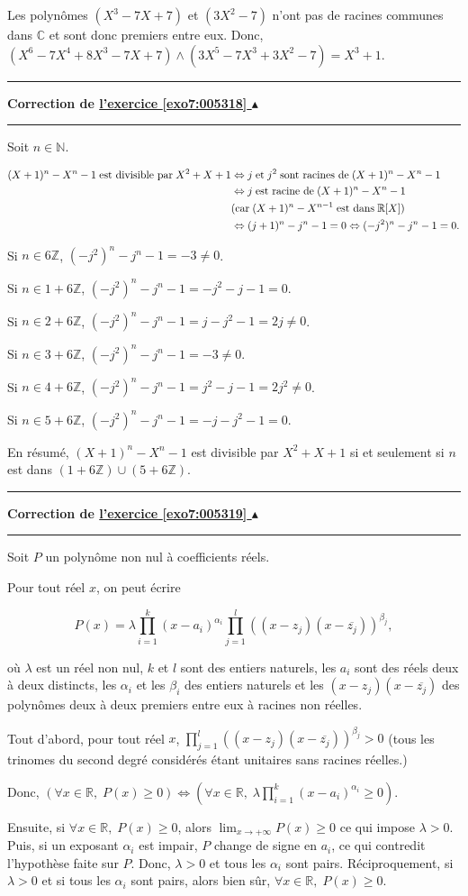 \documentclass[11pt,a4paper]{article}
\newcommand{\Nn}{\mathbb{N}} \newcommand{\N}{\mathbb{N}}
\newcommand{\Zz}{\mathbb{Z}} \newcommand{\Z}{\mathbb{Z}}
\newcommand{\Rr}{\mathbb{R}} \newcommand{\R}{\mathbb{R}}
\newcommand{\Cc}{\mathbb{C}} \newcommand{\C}{\mathbb{C}}
\newcounter{exo}
\newcommand{\correction}[1]{\hypertarget{cor7:#1}{}\label{cor7:#1}{\bf Correction de \hyperlink{exo7:#1}{l'exercice \ref{exo7:#1} $\blacktriangle$}}\vspace{1mm}\hrule\vspace{1mm}}
\newcommand{\fincorrection}{\vspace{1mm}\hrule\vspace*{7mm}}
\begin{document}
Les polynômes $(X^3-7X+7)$ et $(3X^2-7)$ n'ont pas de racines communes dans $\Cc$ et sont donc premiers entre eux. Donc, $(X^6-7X^4+8X^3-7X+7)\wedge(3X^5-7X^3+3X^2-7)=X^3+1$.
\fincorrection
\correction{005318}
Soit $n\in\Nn$.

\begin{align*}\ensuremath
(X+1)^n-X^n-1\;\mbox{est divisible par}\;X^2+X+1&\Leftrightarrow j\;\mbox{et}\;j^2\;\mbox{sont racines de}\;(X+1)^n-X^n-1\\
 &\Leftrightarrow j\;\mbox{est racine de}\;(X+1)^n-X^n-1\\
 &(\mbox{car}\;(X+1)^n-X^{n-1}\;\mbox{est dans}\;\Rr[X])\\
 &\Leftrightarrow(j+1)^n-j^n-1=0\Leftrightarrow(-j^2)^n-j^n-1=0.
\end{align*}

Si $n\in6\Zz$, $(-j^2)^n-j^n-1=-3\neq0$.
 
Si $n\in1+6\Zz$, $(-j^2)^n-j^n-1=-j^2-j-1=0$.
 
Si $n\in2+6\Zz$, $(-j^2)^n-j^n-1=j-j^2-1=2j\neq0$.
 
Si $n\in3+6\Zz$, $(-j^2)^n-j^n-1=-3\neq0$.
 
Si $n\in4+6\Zz$, $(-j^2)^n-j^n-1=j^2-j-1=2j^2\neq0$.
 
Si $n\in5+6\Zz$, $(-j^2)^n-j^n-1=-j-j^2-1=0$.

En résumé, $(X+1)^n-X^n-1$ est divisible par $X^2+X+1$ si et seulement si $n$ est dans $(1+6\Zz)\cup(5+6\Zz)$.

\fincorrection
\correction{005319}
Soit $P$ un polynôme non nul à coefficients réels.

Pour tout réel $x$, on peut écrire 

$$P(x)=\lambda\prod_{i=1}^{k}(x-a_i)^{\alpha_i}\prod_{j=1}^{l}((x-z_j)(x-\overline{z_j}))^{\beta_j},$$

où $\lambda$ est un réel non nul, $k$ et $l$ sont des entiers naturels, les $a_i$ sont des réels deux à deux distincts, les $\alpha_i$ et les $\beta_i$ des entiers naturels et les $(x-z_j)(x-\overline{z_j})$ des polynômes deux à deux premiers entre eux à racines non réelles.

Tout d'abord, pour tout réel $x$, $\prod_{j=1}^{l}((x-z_j)(x-\overline{z_j}))^{\beta_j}>0$ (tous les trinomes du second degré considérés étant unitaires sans racines réelles.)

Donc, $(\forall x\in\Rr,\;P(x)\geq0)\Leftrightarrow(\forall x\in\Rr,\;\lambda\prod_{i=1}^{k}(x-a_i)^{\alpha_i}\geq0)$.

Ensuite, si $\forall x\in\Rr,\;P(x)\geq0$, alors $\lim_{x\rightarrow +\infty}P(x)\geq0$ ce qui impose $\lambda>0$. Puis, si un exposant $\alpha_i$ est impair, $P$ change de signe en $a_i$,  ce qui contredit l'hypothèse faite sur $P$. Donc, $\lambda>0$ et tous les $\alpha_i$ sont pairs. Réciproquement, si $\lambda>0$ et si tous les $\alpha_i$ sont pairs, alors bien sûr, $\forall x\in\Rr,\;P(x)\geq0$.
\end{document}
